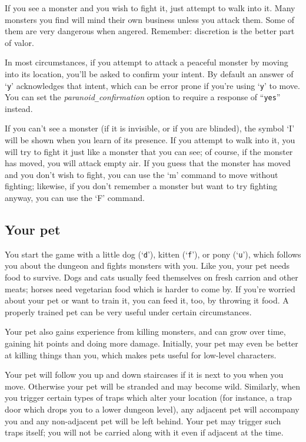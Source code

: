 If you see a monster and you wish to fight it, just attempt to walk
into it.  Many monsters you find will mind their own business unless
you attack them.  Some of them are very dangerous when angered.
Remember:  discretion is the better part of valor.

In most circumstances, if you attempt to attack a peaceful monster by
moving into its location, you'll be asked to confirm your intent.  By
default an answer of `{\tt y}' acknowledges that intent,
which can be error prone if you're using `{\tt y}' to move.  You can set the
{\it paranoid\verb+_+confirmation\/}
option to require a response of ``{\tt yes}'' instead.

If you can't see a monster (if it is invisible, or if you are blinded),
the symbol `I' will be shown when you learn of its presence.
If you attempt to walk into it, you will try to fight it just like
a monster that you can see; of course,
if the monster has moved, you will attack empty air.  If you guess
that the monster has moved and you don't wish to fight, you can use the `m'
command to move without fighting; likewise, if you don't remember a monster
but want to try fighting anyway, you can use the `F' command.

\subsection*{Your pet}

You start the game with a little dog (`{\tt d}'), kitten (`{\tt f}'),
or pony (`{\tt u}'), which follows
you about the dungeon and fights monsters with you.
Like you, your pet needs food to survive.
Dogs and cats usually feed themselves on fresh carrion and other meats;
horses need vegetarian food which is harder to come by.
If you're worried about your pet or want to train it, you
can feed it, too, by throwing it food.
A properly trained pet can be very useful under certain circumstances.

Your pet also gains experience from killing monsters, and can grow
over time, gaining hit points and doing more damage.  Initially, your
pet may even be better at killing things than you, which makes pets
useful for low-level characters.

Your pet will follow you up and down staircases if it is next to you
when you move.  Otherwise your pet will be stranded and may become
wild.  Similarly, when you trigger certain types of traps which alter
your location (for instance, a trap door which drops you to a lower
dungeon level), any adjacent pet will accompany you and any non-adjacent
pet will be left behind.  Your pet may trigger such traps itself; you
will not be carried along with it even if adjacent at the time.

